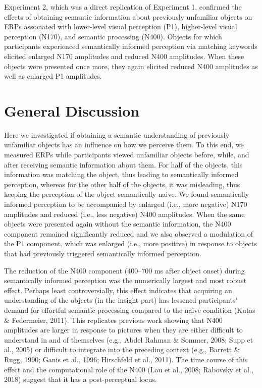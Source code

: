 \documentclass[
  english,
  doc,12pt,twoside,floatsintext]{apa7}
\begin{document}
Experiment 2, which was a direct replication of Experiment 1, confirmed the effects of obtaining semantic information about previously unfamiliar objects on ERPs associated with lower-level visual perception (P1), higher-level visual perception (N170), and semantic processing (N400). Objects for which participants experienced semantically informed perception via matching keywords elicited enlarged N170 amplitudes and reduced N400 amplitudes. When these objects were presented once more, they again elicited reduced N400 amplitudes as well as enlarged P1 amplitudes.

\hypertarget{general-discussion}{%
\section{General Discussion}\label{general-discussion}}

Here we investigated if obtaining a semantic understanding of previously unfamiliar objects has an influence on how we perceive them. To this end, we measured ERPs while participants viewed unfamiliar objects before, while, and after receiving semantic information about them. For half of the objects, this information was matching the object, thus leading to semantically informed perception, whereas for the other half of the objects, it was misleading, thus keeping the perception of the object semantically naive. We found semantically informed perception to be accompanied by enlarged (i.e., more negative) N170 amplitudes and reduced (i.e., less negative) N400 amplitudes. When the same objects were presented again without the semantic information, the N400 component remained significantly reduced and we also observed a modulation of the P1 component, which was enlarged (i.e., more positive) in response to objects that had previously triggered semantically informed perception.

The reduction of the N400 component (400--700 ms after object onset) during semantically informed perception was the numerically largest and most robust effect. Perhaps least controversially, this effect indicates that acquiring an understanding of the objects (in the insight part) has lessened participants' demand for effortful semantic processing compared to the naive condition (Kutas \& Federmeier, 2011). This replicates previous work showing that N400 amplitudes are larger in response to pictures when they are either difficult to understand in and of themselves (e.g., Abdel Rahman \& Sommer, 2008; Supp et al., 2005) or difficult to integrate into the preceding context (e.g., Barrett \& Rugg, 1990; Ganis et al., 1996; Hirschfeld et al., 2011). The time course of this effect and the computational role of the N400 (Lau et al., 2008; Rabovsky et al., 2018) suggest that it has a post-perceptual locus.
\end{document}
